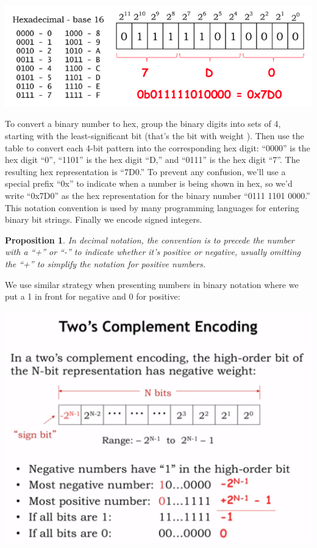 \documentclass[a4paper,twoside]{article}
\newtheorem{proposition}[theorem]{Proposition}
\numberwithin{equation}{section}
\begin{document}
\begin{center}
    \includegraphics[scale=0.4]{assets/hexadecimal_notation.png}
\end{center}
To convert a binary number to hex, group the binary digits into sets of 4, starting with the
least-significant bit (that's the bit with weight ). Then use the table to convert each 4-bit
 pattern into the corresponding hex digit: “0000” is the hex digit “0”, “1101” is the hex digit “D,”
  and “0111” is the hex digit “7”. The resulting hex representation is “7D0.” To prevent any confusion,
  we'll use a special prefix “0x” to indicate when a number is being shown in hex, so we'd write “0x7D0”
   as the hex representation for the binary number “0111 1101 0000.” This notation convention is used
   by many programming languages for entering binary bit strings. \newline
Finally we encode signed integers.
\begin{proposition}
    In decimal notation, the convention is to precede the number with a “+” or “-” to indicate whether
    it's positive or negative, usually omitting the “+” to simplify the notation for positive numbers.
\end{proposition}
We use similar strategy when presenting numbers in binary notation where we put a 1 in front for
negative and 0 for positive:
\begin{center}
    \includegraphics[scale=0.2]{assets/twos_complement.png}
\end{center}
\end{document}
